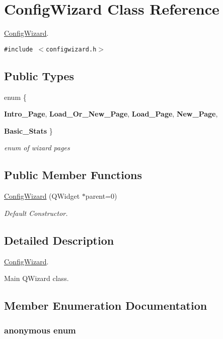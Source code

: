 \hypertarget{classConfigWizard}{
\section{ConfigWizard Class Reference}
\label{classConfigWizard}
}
\hyperlink{classConfigWizard}{ConfigWizard}.  


{\tt \#include $<$configwizard.h$>$}

\subsection*{Public Types}
\begin{CompactItemize}
\item 
enum \{ \par
\textbf{Intro\_\-Page}, 
\textbf{Load\_\-Or\_\-New\_\-Page}, 
\textbf{Load\_\-Page}, 
\textbf{New\_\-Page}, 
\par
\textbf{Basic\_\-Stats}
 \}
\begin{CompactList}\small\item\em enum of wizard pages \item\end{CompactList}\end{CompactItemize}
\subsection*{Public Member Functions}
\begin{CompactItemize}
\item 
\hyperlink{classConfigWizard_7980315d7bb0393fb519af33aaaa39d8}{ConfigWizard} (QWidget $\ast$parent=0)
\begin{CompactList}\small\item\em Default Constructor. \item\end{CompactList}\end{CompactItemize}


\subsection{Detailed Description}
\hyperlink{classConfigWizard}{ConfigWizard}. 

Main QWizard class. 

\subsection{Member Enumeration Documentation}
\hypertarget{classConfigWizard_8a78c53dc0e139b26f7eac35ef46e79b}{
\subsubsection[{"@0}]{\setlength{\rightskip}{0pt plus 5cm}anonymous enum}}
\label{classConfigWizard_8a78c53dc0e139b26f7eac35ef46e79b}


